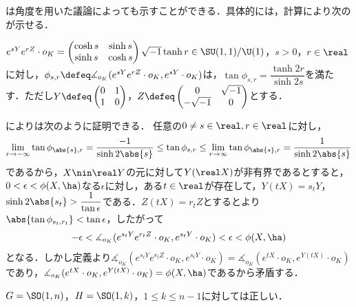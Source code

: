 \begin{rem}\label{rem:su11-by-angle}

  は角度を用いた議論によっても示すことができる．具体的には，計算により次のが示せる．
  \begin{lem}\label{lem:0106}
    $e^{sY}e^{rZ}\cdot o_K =
    \begin{pmatrix}
      \cosh s & \sinh s\\ \sinh s & \cosh s
    \end{pmatrix}
    \sqrt{-1}\tanh r \in \SU(1,1)/\U(1) $，$s > 0$，$r\in \real$に対し，$\phi_{s,r}\defeq \measuredangle_{o_K}(e^{sY}e^{rZ}\cdot o_K, e^{sY}\cdot o_K) $は，$\tan \phi_{s,r} = \dfrac{\tanh 2r}{\sinh 2s} $を満たす．ただし$Y \defeq
  \begin{pmatrix}
    0 & 1\\ 1 & 0
  \end{pmatrix}
  $，$Z \defeq \begin{pmatrix}
    0 & \sqrt{-1} \\ -\sqrt{-1} & 0
  \end{pmatrix}$とする．
  \end{lem}  

  によりは次のように証明できる．
  任意の$0\neq s\in \real, r\in \real $に対し，
  \begin{align}
    \lim_{r\to -\infty}\tan \phi_{\abs{s},r} = \dfrac{-1}{\sinh 2\abs{s}}  \leq \tan \phi_{s,r} \leq  \lim_{r\to \infty}\tan \phi_{\abs{s},r} = \dfrac{1}{\sinh 2\abs{s}}\label{eq:0106}
  \end{align}
  であるから，$X\nin \real Y $の元に対して$Y(\real X) $が非有界であるとすると，$ 0 <  \epsilon < \phi(X,\ha)$なる$\epsilon$に対し，ある$t\in \real $が存在して，$Y(tX) = s_tY $，$\sinh 2\abs{s_t} > \dfrac{1}{\tan \epsilon} $である．$Z(tX) = r_tZ $とするとより$\abs{\tan \phi_{s_t,r_t}} < \tan \epsilon $，したがって
  \begin{align*}
    -\epsilon < \measuredangle_{o_K}(e^{s_tY}e^{r_t Z}\cdot o_K, e^{s_tY}\cdot o_K) < \epsilon < \phi(X,\ha)
  \end{align*}
  となる．しかし定義より$\measuredangle_{o_K}(e^{s_tY}e^{r_t Z}\cdot o_K, e^{s_tY}\cdot o_K) = \measuredangle_{o_K}(e^{tX}\cdot o_K, e^{Y(tX) }\cdot o_K) $であり，$\measuredangle_{o_K}(e^{tX}\cdot o_K, e^{Y(tX) }\cdot o_K) = \phi(X,\ha)$であるから矛盾する．

  
\end{rem}

\begin{cor}\label{cor:prob-eg}
  $G = \SO(1,n) $，$H = \SO(1,k) $，$1\leq k\leq n-1$に対しては正しい．
\end{cor}


